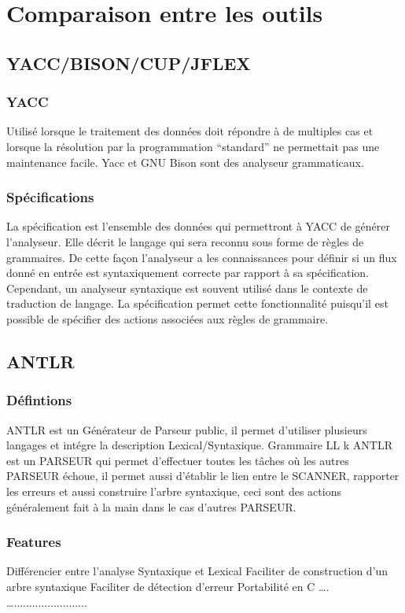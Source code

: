 \documentclass{article}
\begin{document}
\section{Comparaison entre les outils}
\label{hints}
\subsection{YACC/BISON/CUP/JFLEX}
\subsubsection{YACC}
	Utilisé lorsque le traitement des données doit répondre à de multiples cas et lorsque la
résolution par la programmation “standard” ne permettait pas une maintenance facile.
Yacc et GNU Bison sont des analyseur grammaticaux.
\subsubsection{Spécifications}
	La spécification est l’ensemble des données qui permettront à YACC de générer l’analyseur. Elle décrit le langage qui sera reconnu sous forme de règles de grammaires. De cette façon l’analyseur a les connaissances pour définir si un flux donné en entrée est syntaxiquement correcte par rapport à sa spécification.
Cependant, un analyseur syntaxique est souvent utilisé dans le contexte de traduction de langage. La spécification permet cette fonctionnalité puisqu’il est possible de spécifier des actions associées aux règles de grammaire.

\subsection{ANTLR}
\subsubsection{Défintions}
	ANTLR est un Générateur de  Parseur public, il permet d’utiliser plusieurs langages et intégre la description Lexical/Syntaxique.
Grammaire LL k
ANTLR est un PARSEUR qui permet d’effectuer toutes les tâches où les autres PARSEUR échoue, il permet aussi d’établir le lien entre le SCANNER, rapporter les erreurs et aussi construire l’arbre syntaxique, ceci sont des actions généralement fait à la main dans le cas d’autres PARSEUR.
\subsubsection{Features}
	Différencier entre l’analyse Syntaxique et Lexical
	Faciliter de construction d’un arbre syntaxique
	Faciliter de détection d’erreur
	Portabilité en C ….
	…........................
\end{document}
